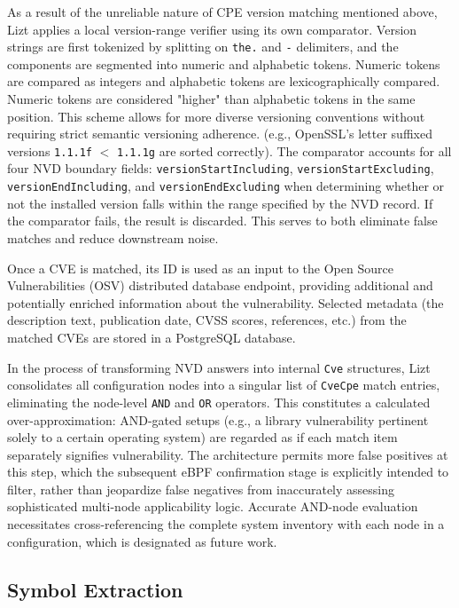 \documentclass[conference]{IEEEtran}
\begin{document}
As a result of the unreliable nature of CPE version matching mentioned above, Lizt applies a local version-range verifier using its own comparator. Version strings are first tokenized by splitting on \texttt{the.} and \texttt{-} delimiters, and the components are segmented into numeric and alphabetic tokens. Numeric tokens are compared as integers and alphabetic tokens are lexicographically compared. Numeric tokens are considered "higher" than alphabetic tokens in the same position. This scheme allows for more diverse versioning conventions without requiring strict semantic versioning adherence. (e.g., OpenSSL's letter suffixed versions \texttt{1.1.1f} $<$ \texttt{1.1.1g} are sorted correctly).
The comparator accounts for all four NVD boundary fields: \texttt{versionStartIncluding}, \texttt{versionStartExcluding}, \texttt{versionEndIncluding}, and \texttt{versionEndExcluding} when determining whether or not the installed version falls within the range specified by the NVD record. If the comparator fails, the result is discarded. This serves to both eliminate false matches and reduce downstream noise.

Once a CVE is matched, its ID is used as an input to the Open Source Vulnerabilities (OSV) distributed database endpoint, providing additional and potentially enriched information about the vulnerability. Selected metadata (the description text, publication date, CVSS scores, references, etc.) from the matched CVEs are stored in a  PostgreSQL database.

In the process of transforming NVD answers into internal \texttt{Cve} structures, Lizt consolidates all configuration nodes into a singular list of \texttt{CveCpe} match entries, eliminating the node-level \texttt{AND} and \texttt{OR} operators. This constitutes a calculated over-approximation: AND-gated setups (e.g., a library vulnerability pertinent solely to a certain operating system) are regarded as if each match item separately signifies vulnerability. The architecture permits more false positives at this step, which the subsequent eBPF confirmation stage is explicitly intended to filter, rather than jeopardize false negatives from inaccurately assessing sophisticated multi-node applicability logic. Accurate AND-node evaluation necessitates cross-referencing the complete system inventory with each node in a configuration, which is designated as future work.

\subsection{Symbol Extraction}
\end{document}
